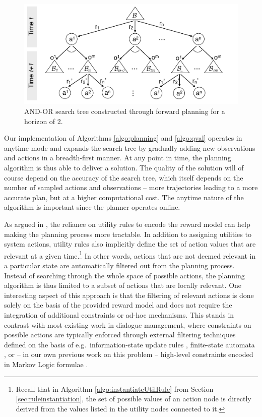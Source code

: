 \begin{figure}[h!]
\centering
\includegraphics[scale=0.30]{imgs/andortree.pdf}
\caption{AND-OR search tree constructed through forward planning for a horizon of 2.}
\label{fig:andortree}
\end{figure}

Our implementation of Algorithms \ref{algo:planning} and \ref{algo:qval} operates in anytime mode and expands the search tree by gradually adding new observations and actions in a breadth-first manner. At any point in time, the planning algorithm is thus able to deliver a solution. The quality of the solution will of course depend on the accuracy of the search tree, which itself depends on the number of sampled actions and observations -- more trajectories leading to a more accurate plan, but at a higher computational cost.  The anytime nature of the algorithm is important since the planner operates online.

As argued in \cite{onlineplanning-iwsds2012}, the reliance on utility rules to encode the reward model can help making the planning process more tractable.  In addition to assigning utilities to system actions, utility rules also implicitly define the set of action values that are relevant at a given time.\footnote{Recall that in Algorithm \ref{algo:instantiateUtilRule} from Section \ref{sec:ruleinstantiation}, the set of possible values of an action node is directly derived from the values listed in the utility nodes connected to it.} In other words, actions that are not deemed relevant in a particular state are automatically filtered out from the planning process.  Instead of searching through the whole space of possible actions, the planning algorithm is thus limited to a subset of actions that are locally relevant.  One interesting aspect of this approach is that the filtering of relevant actions is done solely on the basis of the provided reward model and does not require the integration of additional constraints or ad-hoc mechanisms. This stands in contrast with most existing work in dialogue management, where constraints on possible actions are typically enforced through external filtering techniques defined on the basis of e.g.\ information-state update rules \citep{heeman2007}, finite-state automata \citep{williams2008}, or -- in our own previous work on this problem -- high-level constraints encoded in Markov Logic formulae \citep{srw-acl2010}. 

